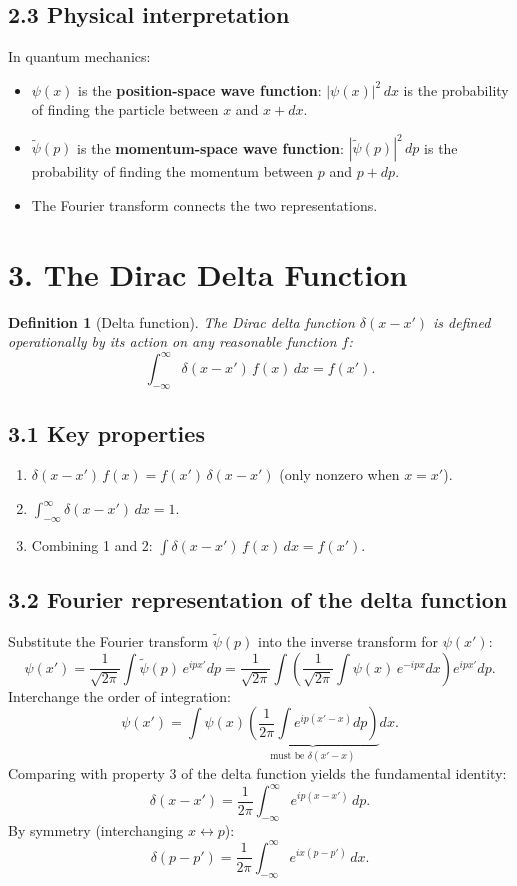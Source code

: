 \documentclass[12pt,a4paper]{article}
\newtheorem{definition}{Definition}
\begin{document}
\subsection{2.3 Physical interpretation}
In quantum mechanics:
\begin{itemize}[nosep]
    \item $\psi(x)$ is the \textbf{position-space wave function}: $|\psi(x)|^2\,dx$ is the probability of finding the particle between $x$ and $x+dx$.
    \item $\tilde{\psi}(p)$ is the \textbf{momentum-space wave function}: $|\tilde{\psi}(p)|^2\,dp$ is the probability of finding the momentum between $p$ and $p+dp$.
    \item The Fourier transform connects the two representations.
\end{itemize}

\section{3. The Dirac Delta Function}

\begin{definition}[Delta function]
The Dirac delta function $\delta(x-x')$ is defined operationally by its action on any reasonable function $f$:
\[
    \int_{-\infty}^{\infty} \delta(x-x')\,f(x)\,dx = f(x').
\]
\end{definition}

\subsection{3.1 Key properties}
\begin{enumerate}[nosep]
    \item $\delta(x-x')\,f(x) = f(x')\,\delta(x-x')$ \quad (only nonzero when $x=x'$).
    \item $\displaystyle\int_{-\infty}^{\infty}\delta(x-x')\,dx = 1$.
    \item Combining 1 and 2: $\displaystyle\int \delta(x-x')\,f(x)\,dx = f(x')$.
\end{enumerate}

\subsection{3.2 Fourier representation of the delta function}
Substitute the Fourier transform $\tilde{\psi}(p)$ into the inverse transform for $\psi(x')$:
\[
    \psi(x') = \frac{1}{\sqrt{2\pi}}\int \tilde{\psi}(p)\,e^{ipx'}dp
    = \frac{1}{\sqrt{2\pi}}\int\left(\frac{1}{\sqrt{2\pi}}\int\psi(x)\,e^{-ipx}dx\right)e^{ipx'}dp.
\]
Interchange the order of integration:
\[
    \psi(x') = \int\psi(x)\underbrace{\left(\frac{1}{2\pi}\int e^{ip(x'-x)}dp\right)}_{\text{must be }\delta(x'-x)}dx.
\]
Comparing with property 3 of the delta function yields the fundamental identity:
\[
    \boxed{\delta(x-x') = \frac{1}{2\pi}\int_{-\infty}^{\infty} e^{ip(x-x')}\,dp.}
\]
By symmetry (interchanging $x\leftrightarrow p$):
\[
    \delta(p-p') = \frac{1}{2\pi}\int_{-\infty}^{\infty} e^{ix(p-p')}\,dx.
\]
\end{document}
